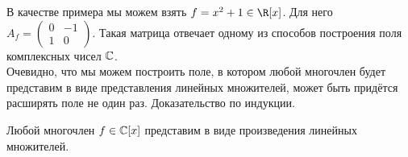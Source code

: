В качестве примера мы можем взять $f=x^2+1\in\R[x]$. Для него $A_f=\left(\begin{smallmatrix}0&-1\\1&0\end{smallmatrix}\right)$. Такая матрица отвечает одному из способов построения поля комплексных чисел $\mathbb{C}$.\\

Очевидно, что мы можем построить поле, в котором любой многочлен будет представим в виде представления линейных множителей, может быть придётся расширять поле не один раз. Доказательство по индукции.

\begin{theorem}
  Любой многочлен $f\in\mathbb{C}[x]$ представим в виде произведения линейных множителей.
\end{theorem}

